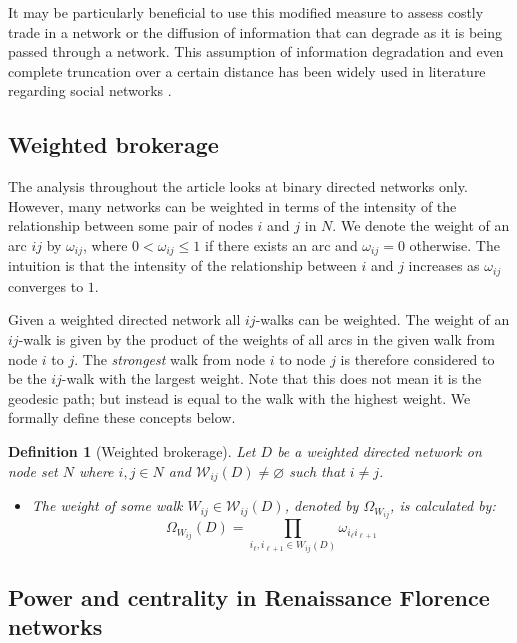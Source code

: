 \documentclass[11pt,fleqn]{article}
\newtheorem{definition}[theorem]{Definition}
\begin{document}
It may be particularly beneficial to use this modified measure to assess costly trade in a network or the diffusion of information that can degrade as it is being passed through a network. This assumption of information degradation and even complete truncation over a certain distance has been widely used in literature regarding social networks \citep{JacksonRogers2005}.

\subsection{Weighted brokerage}

The analysis throughout the article looks at binary directed networks only. However, many networks can be weighted in terms of the intensity of the relationship between some pair of nodes $i$ and $j$ in $N$. We denote the weight of an arc $ij$ by $\omega_{ij}$, where $0 < \omega_{ij} \leq 1$ if there exists an arc and $\omega_{ij} = 0$ otherwise. The intuition is that the intensity of the relationship between $i$ and $j$ increases as $\omega_{ij}$ converges to $1$.

Given a weighted directed network all $ij$-walks can be weighted. The weight of an $ij$-walk is given by the product of the weights of all arcs in the given walk from node $i$ to $j$. The \emph{strongest} walk from node $i$ to node $j$ is therefore considered to be the $ij$-walk with the largest weight. Note that this does not mean it is the geodesic path; but instead is equal to the walk with the highest weight. We formally define these concepts below.
\begin{definition}[Weighted brokerage]
Let $D$ be a weighted directed network on node set $N$ where $i,j \in N$ and $\mathcal{W}_{ij}(D) \neq \varnothing$ such that $i \neq j$.
\begin{itemize}
\item[(a)] The weight of some walk $W_{ij} \in \mathcal{W}_{ij}(D)$, denoted by $\Omega_{W_{ij}}$, is calculated by:
\begin{equation}
\Omega_{W_{ij}}(D) = \prod_{i_{\ell},i_{\ell+1} \in W_{ij}(D)} \omega_{i_{\ell}i_{\ell+1}}
\end{equation}

\end{itemize}

\end{definition}


\subsection{Power and centrality in Renaissance Florence networks} 
\label{A}
\end{document}
